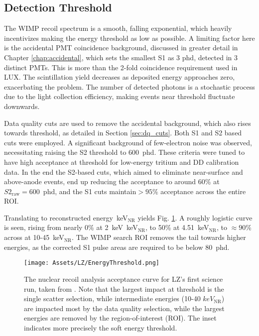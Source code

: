 \subsection{Detection Threshold}

The WIMP recoil spectrum is a smooth, falling exponential, which heavily incentivizes making the energy threshold as low as possible.
A limiting factor here is the accidental PMT coincidence background, discussed in greater detail in Chapter \ref{chap:accidental}, which sets the smallest S1 as 3 phd, detected in 3 distinct PMTs.
This is more than the 2-fold coincidence requirement used in LUX.
The scintillation yield decreases as deposited energy approaches zero, exacerbating the problem. 
The number of detected photons is a stochastic process due to the light collection efficiency, making events near threshold fluctuate downwards.

Data quality cuts are used to remove the accidental background, which also rises towards threshold, as detailed in Section \ref{sec:dq_cuts}.
Both S1 and S2 based cuts were employed.
A significant background of few-electron noise was observed, necessitating raising the S2 threshold to 600~phd.
These criteria were tuned to have high acceptance at threshold for low-energy tritium and DD calibration data.
In the end the S2-based cuts, which aimed to eliminate near-surface and above-anode events, end up reducing the acceptance to around 60\% at $S2_{\mathrm{raw}} = 600$~phd, and the S1 cuts maintain$>95\%$ acceptance across the entire ROI.

Translating to reconstructed energy~keV$_{\mathrm{NR}}$ yields Fig. \ref{fig:energy_threshold}.
A roughly logistic curve is seen, rising from nearly 0\% at 2~keV~keV$_{\mathrm{NR}}$, to 50\% at 4.51~keV$_{\mathrm{NR}}$, to $\approx 90$\% across at 10-45~keV$_{\mathrm{NR}}$.
The WIMP search ROI removes the tail towards higher energies, as the corrected S1 pulse areas are required to be below $80$~phd.

\begin{figure}
    \centering
    \texttt{[image: Assets/LZ/EnergyThreshold.png]}
    \caption[ The nuclear recoil analysis acceptance curve for LZ's first science run.]%
    {
    The nuclear recoil analysis acceptance curve for LZ's first science run, taken from \cite{aalbers_first_2022}.
   Note that the largest impact at threshold is the single scatter selection, while intermediate energies (10-40 $keV_{\mathrm{NR}}$) are impacted most by the data quality selection, while the largest energies are removed by the region-of-interest (ROI).
   The inset indicates more precisely the soft energy threshold.}
    \label{fig:energy_threshold}
\end{figure}


